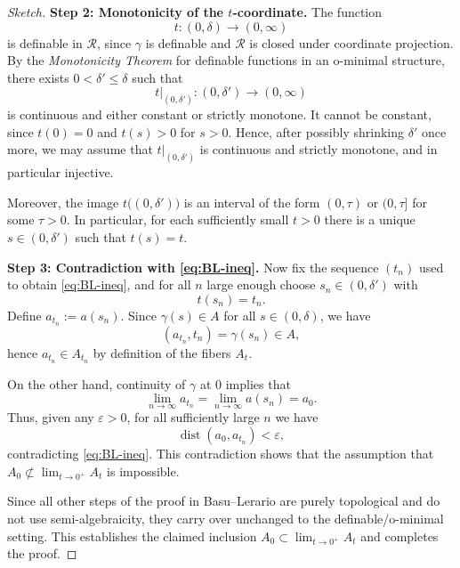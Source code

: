 \begin{proof}[Sketch]
    \medskip
    
    \noindent\textbf{Step 2: Monotonicity of the $t$-coordinate.}
    The function
    \[
    t \colon (0,\delta) \to (0,\infty)
    \]
    is definable in $\mathcal{R}$, since $\gamma$ is definable and
    $\mathcal{R}$ is closed under coordinate projection. By the
    \emph{Monotonicity Theorem} for definable functions in an o\mbox{-}minimal
    structure, there exists $0 < \delta' \leq \delta$ such that
    \[
    t \big\vert_{(0,\delta')} \colon (0,\delta') \to (0,\infty)
    \]
    is continuous and either constant or strictly monotone. It cannot be
    constant, since $t(0) = 0$ and $t(s) > 0$ for $s > 0$. Hence, after
    possibly shrinking $\delta'$ once more, we may assume that
    $t \big\vert_{(0,\delta')}$ is continuous and strictly monotone, and in
    particular injective.
    
    Moreover, the image $t\bigl( (0,\delta') \bigr)$ is an interval of the
    form $(0,\tau)$ or $(0,\tau]$ for some $\tau>0$. In particular,
    for each sufficiently small $t>0$ there is a unique $s \in (0,\delta')$
    such that $t(s) = t$.
    
    \noindent\textbf{Step 3: Contradiction with \eqref{eq:BL-ineq}.}
    Now fix the sequence $(t_n)$ used to obtain \eqref{eq:BL-ineq}, and for
    all $n$ large enough choose $s_n \in (0,\delta')$ with
    \begin{equation*}
    t(s_n) = t_n.
    \end{equation*}
    Define $a_{t_n} := a(s_n)$. Since $\gamma(s) \in A$ for all
    $s \in (0,\delta)$, we have
    \[
    (a_{t_n}, t_n) = \gamma(s_n) \in A,
    \]
    hence $a_{t_n} \in A_{t_n}$ by definition of the fibers $A_t$.
    
    On the other hand, continuity of $\gamma$ at $0$ implies that
    \[
    \lim_{n\to\infty} a_{t_n} = \lim_{n\to\infty} a(s_n) = a_0.
    \]
    Thus, given any $\varepsilon>0$, for all sufficiently large $n$ we have
    \[
    \operatorname{dist}(a_0, a_{t_n}) < \varepsilon,
    \]
    contradicting \eqref{eq:BL-ineq}. This contradiction shows that the
    assumption that $A_0 \not\subset \lim_{t\to 0^+} A_t$ is impossible.
    
    Since all other steps of the proof in Basu--Lerario are purely
    topological and do not use semi-algebraicity, they carry over unchanged
    to the definable/o\mbox{-}minimal setting. This establishes the claimed
    inclusion $A_0 \subset \lim_{t\to 0^+} A_t$ and completes the proof.
    \end{proof}
    